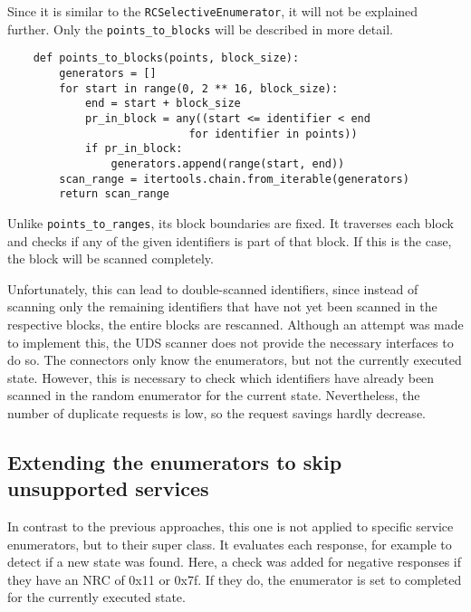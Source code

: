 Since it is similar to the \texttt{RCSelectiveEnumerator}, it will not be explained further. Only the \texttt{points_to_blocks} will be described in more detail.

\begin{samepage}
\begin{verbatim}
    def points_to_blocks(points, block_size):
        generators = []
        for start in range(0, 2 ** 16, block_size):
            end = start + block_size
            pr_in_block = any((start <= identifier < end
                            for identifier in points))
            if pr_in_block:
                generators.append(range(start, end))
        scan_range = itertools.chain.from_iterable(generators)
        return scan_range
\end{verbatim}
\end{samepage}

Unlike \texttt{points_to_ranges}, its block boundaries are fixed. It traverses each block and checks if any of the given identifiers is part of that block. If this is the case, the block will be scanned completely.

Unfortunately, this can lead to double-scanned identifiers, since instead of scanning only the remaining identifiers that have not yet been scanned in the respective blocks, the entire blocks are rescanned. Although an attempt was made to implement this, the UDS scanner does not provide the necessary interfaces to do so. The connectors only know the enumerators, but not the currently executed state. However, this is necessary to check which identifiers have already been scanned in the random enumerator for the current state. Nevertheless, the number of duplicate requests is low, so the request savings hardly decrease.

\subsection{Extending the enumerators to skip unsupported services}

In contrast to the previous approaches, this one is not applied to specific service enumerators, but to their super class. It evaluates each response, for example to detect if a new state was found. Here, a check was added for negative responses if they have an NRC of 0x11 or 0x7f. If they do, the enumerator is set to completed for the currently executed state.

